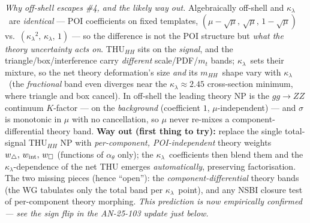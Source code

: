 \documentclass[11pt]{article}
\newcommand{\kl}{\ensuremath{\kappa_\lambda}}
\newcommand{\mhh}{\ensuremath{m_{HH}}}
\begin{document}
\medskip\noindent\emph{Why off-shell escapes \#4, and the likely way out.} Algebraically off-shell and \kl\ are
\emph{identical} --- POI coefficients on fixed templates, $(\mu{-}\sqrt\mu,\,\sqrt\mu,\,1{-}\sqrt\mu)$ vs.\
$(\kl^2,\,\kl,\,1)$ --- so the difference is not the POI structure but \emph{what the theory uncertainty acts on}.
THU$_{HH}$ sits on the \emph{signal}, and the triangle/box/interference carry \emph{different} scale/PDF/$m_t$ bands;
\kl\ sets their mixture, so the net theory deformation's size \emph{and} its \mhh\ shape vary with \kl\ (the
\emph{fractional} band even diverges near the $\kl\!\approx\!2.45$ cross-section minimum, where triangle and box
cancel). In off-shell the leading theory NP is the $gg\to ZZ$ continuum $K$-factor --- on the \emph{background}
(coefficient $1$, $\mu$-independent) --- and $\sigma$ is monotonic in $\mu$ with no cancellation, so $\mu$ never
re-mixes a component-differential theory band. \textbf{Way out (first thing to try):} replace the single
total-signal THU$_{HH}$ NP with \emph{per-component, POI-independent} theory weights
$w_\triangle,\,w_{\rm int},\,w_\square$ (functions of $\alpha_\theta$ only); the \kl\ coefficients then blend them and
the \kl-dependence of the net THU emerges \emph{automatically}, preserving factorisation. The two missing pieces
(hence ``open''): the \emph{component-differential} theory bands (the WG tabulates only the total band per \kl\
point), and any NSBI closure test of per-component theory morphing. \emph{This prediction is now empirically
confirmed --- see the sign flip in the AN-25-103 update just below.}
\end{document}
